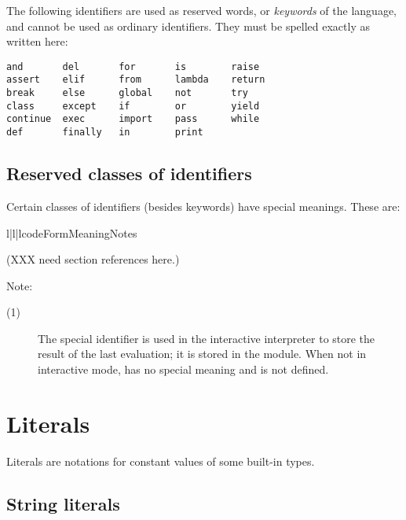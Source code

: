 The following identifiers are used as reserved words, or
\emph{keywords} of the language, and cannot be used as ordinary
identifiers.  They must be spelled exactly as written here:%
%

\begin{verbatim}
and       del       for       is        raise    
assert    elif      from      lambda    return   
break     else      global    not       try      
class     except    if        or        yield    
continue  exec      import    pass      while
def       finally   in        print              
\end{verbatim}



\subsection{Reserved classes of identifiers\label{id-classes}}

Certain classes of identifiers (besides keywords) have special
meanings.  These are:

\begin{tableiii}{l|l|l}{code}{Form}{Meaning}{Notes}
\end{tableiii}

(XXX need section references here.)

Note:

\begin{description}
\item[(1)] The special identifier \samp{_} is used in the interactive
interpreter to store the result of the last evaluation; it is stored
in the  module.  When not in interactive mode,
\samp{_} has no special meaning and is not defined.
\end{description}


\section{Literals\label{literals}}

Literals are notations for constant values of some built-in types.


\subsection{String literals\label{strings}}

